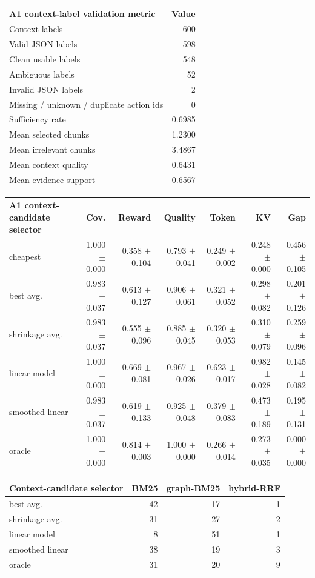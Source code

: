 \begin{center}
\small
\begin{tabular}{l r}
\toprule
A1 context-label validation metric & Value \\
\midrule
Context labels & 600 \\
Valid JSON labels & 598 \\
Clean usable labels & 548 \\
Ambiguous labels & 52 \\
Invalid JSON labels & 2 \\
Missing / unknown / duplicate action ids & 0 \\
Sufficiency rate & 0.6985 \\
Mean selected chunks & 1.2300 \\
Mean irrelevant chunks & 3.4867 \\
Mean context quality & 0.6431 \\
Mean evidence support & 0.6567 \\
\bottomrule
\end{tabular}
\end{center}

{\tiny
\begin{longtable}{>{\raggedright\arraybackslash}p{2.8cm} r r r r r r}
\toprule
A1 context-candidate selector & Cov. & Reward & Quality & Token & KV & Gap \\
\midrule
cheapest & 1.000 $\pm$ 0.000 & 0.358 $\pm$ 0.104 & 0.793 $\pm$ 0.041 & 0.249 $\pm$ 0.002 & 0.248 $\pm$ 0.000 & 0.456 $\pm$ 0.105 \\
best avg. & 0.983 $\pm$ 0.037 & 0.613 $\pm$ 0.127 & 0.906 $\pm$ 0.061 & 0.321 $\pm$ 0.052 & 0.298 $\pm$ 0.082 & 0.201 $\pm$ 0.126 \\
shrinkage avg. & 0.983 $\pm$ 0.037 & 0.555 $\pm$ 0.096 & 0.885 $\pm$ 0.045 & 0.320 $\pm$ 0.053 & 0.310 $\pm$ 0.079 & 0.259 $\pm$ 0.096 \\
linear model & 1.000 $\pm$ 0.000 & 0.669 $\pm$ 0.081 & 0.967 $\pm$ 0.026 & 0.623 $\pm$ 0.017 & 0.982 $\pm$ 0.028 & 0.145 $\pm$ 0.082 \\
smoothed linear & 0.983 $\pm$ 0.037 & 0.619 $\pm$ 0.133 & 0.925 $\pm$ 0.048 & 0.379 $\pm$ 0.083 & 0.473 $\pm$ 0.189 & 0.195 $\pm$ 0.131 \\
oracle & 1.000 $\pm$ 0.000 & 0.814 $\pm$ 0.003 & 1.000 $\pm$ 0.000 & 0.266 $\pm$ 0.014 & 0.273 $\pm$ 0.035 & 0.000 $\pm$ 0.000 \\
\bottomrule
\end{longtable}
}

\begin{center}
\small
\begin{tabular}{l r r r}
\toprule
Context-candidate selector & BM25 & graph-BM25 & hybrid-RRF \\
\midrule
best avg. & 42 & 17 & 1 \\
shrinkage avg. & 31 & 27 & 2 \\
linear model & 8 & 51 & 1 \\
smoothed linear & 38 & 19 & 3 \\
oracle & 31 & 20 & 9 \\
\bottomrule
\end{tabular}
\end{center}

